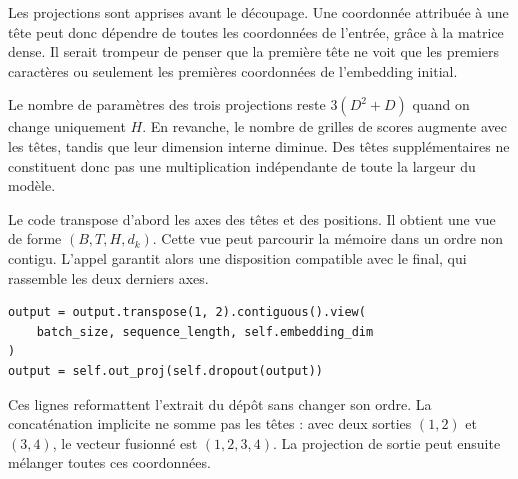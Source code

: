 Les projections sont apprises avant le découpage. Une coordonnée attribuée à une tête peut donc dépendre de toutes les coordonnées de l'entrée, grâce à la matrice dense. Il serait trompeur de penser que la première tête ne voit que les premiers caractères ou seulement les premières coordonnées de l'embedding initial.

Le nombre de paramètres des trois projections reste $3(D^2+D)$ quand on change uniquement $H$. En revanche, le nombre de grilles de scores augmente avec les têtes, tandis que leur dimension interne diminue. Des têtes supplémentaires ne constituent donc pas une multiplication indépendante de toute la largeur du modèle.






Le code transpose d'abord les axes des têtes et des positions. Il obtient une vue de forme $(B,T,H,d_k)$. Cette vue peut parcourir la mémoire dans un ordre non contigu. L'appel  garantit alors une disposition compatible avec le  final, qui rassemble les deux derniers axes.
\begin{lstlisting}
output = output.transpose(1, 2).contiguous().view(
    batch_size, sequence_length, self.embedding_dim
)
output = self.out_proj(self.dropout(output))
\end{lstlisting}
Ces lignes reformattent l'extrait du dépôt sans changer son ordre. La concaténation implicite ne somme pas les têtes : avec deux sorties $(1,2)$ et $(3,4)$, le vecteur fusionné est $(1,2,3,4)$. La projection de sortie peut ensuite mélanger toutes ces coordonnées.


